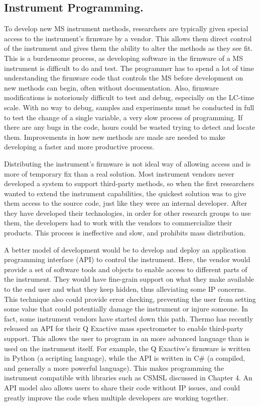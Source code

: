 \subsection*{Instrument Programming.}
To develop new MS instrument methods, researchers are typically given special access to the instrument's firmware by a vendor. This allows them direct control of the instrument and gives them the ability to alter the methods as they see fit. This is a burdensome process, as developing software in the firmware of a MS instrument is difficult to do and test. The programmer has to spend a lot of time understanding the firmware code that controls the MS before development on new methods can begin, often without documentation. Also, firmware modifications is notoriously difficult to test and debug, especially on the LC-time scale. With no way to debug, samples and experiments must be conducted in full to test the change of a single variable, a very slow process of programming. If there are any bugs in the code, hours could be wasted trying to detect and locate them. Improvements in how new methods are made are needed to make developing a faster and more productive process.

Distributing the instrument's firmware is not ideal way of allowing access and is more of temporary fix than a real solution. Most instrument vendors never developed a system to support third-party methods, so when the first researchers wanted to extend the instrument capabilities, the quickest solution was to give them access to the source code, just like they were an internal developer. After they have developed their technologies, in order for other research groups to use them, the developers had to work with the vendors to commercialize their products. This process is ineffective and slow, and prohibits mass distribution. 

A better model of development would be to develop and deploy an application programming interface (API) to control the instrument. Here, the vendor would provide a set of software tools and objects to enable access to different parts of the instrument. They would have fine-grain support on what they make available to the end user and what they keep hidden, thus alleviating some IP concerns. This technique also could provide error checking, preventing the user from setting some value that could potentially damage the instrument or injure someone. In fact, some instrument vendors have started down this path. Thermo has recently released an API for their Q Exactive mass spectrometer to enable third-party support. This allows the user to program in an more advanced language than is used on the instrument itself. For example, the Q Exactive's firmware is written in Python (a scripting language), while the API is written in C\# (a compiled, and generally a more powerful language). This makes programming the instrument compatible with libraries such as CSMSL discussed in Chapter 4. An API model also allows users to share their code without IP issues, and could greatly improve the code when multiple developers are working together. 

